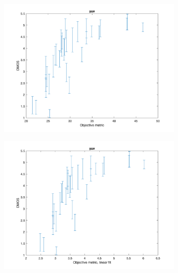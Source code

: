 \documentclass{article}
\begin{document}
\begin{figure}
    \centering
   \begin{subfigure}[b]{0.65\textwidth}
   \includegraphics[width=\textwidth]{Figures/task3/yuv.png}
   \end{subfigure}
   \begin{subfigure}[b]{0.65\textwidth}
   \includegraphics[width=\textwidth]{Figures/task3/yuv_linear.png}
   \end{subfigure}
   \begin{subfigure}[b]{0.65\textwidth}

\end{subfigure}
\end{figure}
\end{document}
